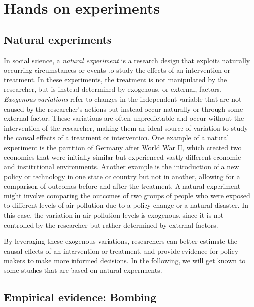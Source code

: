 \documentclass[
  12pt,
  oneside]{book}
\theoremstyle{definition}
\theoremstyle{definition}
\theoremstyle{definition}
\theoremstyle{definition}
\theoremstyle{remark}
\begin{document}
\hypertarget{hands-on-experiments}{%
\chapter{Hands on experiments}\label{hands-on-experiments}}

\hypertarget{natural-experiments}{%
\section{Natural experiments}\label{natural-experiments}}

In social science, a \emph{natural experiment} is a research design that exploits naturally occurring circumstances or events to study the effects of an intervention or treatment. In these experiments, the treatment is not manipulated by the researcher, but is instead determined by exogenous, or external, factors. \emph{Exogenous variations} refer to changes in the independent variable that are not caused by the researcher's actions but instead occur naturally or through some external factor. These variations are often unpredictable and occur without the intervention of the researcher, making them an ideal source of variation to study the causal effects of a treatment or intervention.
One example of a natural experiment is the partition of Germany after World War II, which created two economies that were initially similar but experienced vastly different economic and institutional environments. Another example is the introduction of a new policy or technology in one state or country but not in another, allowing for a comparison of outcomes before and after the treatment.
A natural experiment might involve comparing the outcomes of two groups of people who were exposed to different levels of air pollution due to a policy change or a natural disaster. In this case, the variation in air pollution levels is exogenous, since it is not controlled by the researcher but rather determined by external factors.

By leveraging these exogenous variations, researchers can better estimate the causal effects of an intervention or treatment, and provide evidence for policy-makers to make more informed decisions. In the following, we will get known to some studies that are based on natural experiments.

\hypertarget{empirical-evidence-bombing}{%
\section{Empirical evidence: Bombing}\label{empirical-evidence-bombing}}
\end{document}
